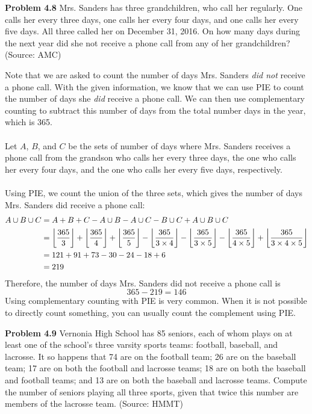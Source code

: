 \documentclass[11pt]{scrartcl}
\DeclarePairedDelimiter\floor{\lfloor}{\rfloor}
\begin{document}
\begin{tcolorbox}
\textbf{Problem 4.8} Mrs. Sanders has three grandchildren, who call her regularly. One calls her every three days, one calls her every four days, and one calls her every five days. All three called her on December 31, 2016. On how many days during the next year did she not receive a phone call from any of her grandchildren? (Source: AMC)
\end{tcolorbox}
\noindent 
Note that we are asked to count the number of days Mrs. Sanders \textit{did not} receive a phone call. With the given information, we know that we can use PIE to count the number of days she \textit{did} receive a phone call. We can then use complementary counting to subtract this number of days from the total number days in the year, which is 365. \\
\\
\noindent 
Let $A$, $B$, and $C$ be the sets of number of days where Mrs. Sanders receives a phone call from the grandson who calls her every three days, the one who calls her every four days, and the one who calls her every five days, respectively.\\
\\
\noindent
Using PIE, we count the union of the three sets, which gives the number of days Mrs. Sanders did receive a phone call:  
\begin{align*}
    {A \cup B \cup C } &={A}+{B}+{C}-{A \cup B}-{A \cup C}-{B \cup C}+{A \cup B \cup C} \\
                       &= { \floor*{\frac{365}{3}}}+{ \floor*{\frac{365}{4}}}+\floor*{\frac{365}{5}}-\floor*{\frac{365}{3 \times 4}}-\floor*{\frac{365}{3 \times 5}}-\floor*{\frac{365}{4 \times 5}}+\floor*{\frac{365}{3 \times 4 \times 5}} \\
                       &= 121+91+73-30-24-18+6 \\
                       &=219
\end{align*}
Therefore, the number of days Mrs. Sanders did not receive a phone call is 
$$365-219=146$$
\noindent 
Using complementary counting with PIE is very common. When it is not possible to directly count something, you can usually count the complement using PIE. 
\\
\begin{tcolorbox}
\textbf{Problem 4.9} Vernonia High School has 85 seniors, each of whom plays on at least one of the school’s
three varsity sports teams: football, baseball, and lacrosse. It so happens that 74 are
on the football team; 26 are on the baseball team; 17 are on both the football and
lacrosse teams; 18 are on both the baseball and football teams; and 13 are on both the
baseball and lacrosse teams. Compute the number of seniors playing all three sports,
given that twice this number are members of the lacrosse team. (Source: HMMT)
\end{tcolorbox}
\end{document}
